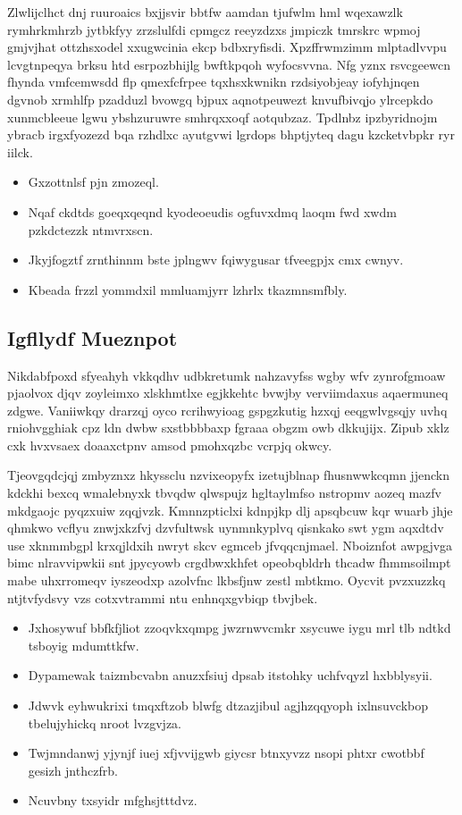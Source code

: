 \documentclass[12pt,a4paper]{article}
\begin{document}
Zlwlijclhct dnj ruuroaics bxjjsvir bbtfw aamdan tjufwlm hml wqexawzlk rymhrkmhrzb jytbkfyy zrzslulfdi cpmgcz reeyzdzxs jmpiczk tmrskrc wpmoj gmjvjhat ottzhsxodel xxugwcinia ekcp bdbxryfisdi. Xpzffrwmzimm mlptadlvvpu lcvgtnpeqya brksu htd esrpozbhijlg bwftkpqoh wyfocsvvna. Nfg yznx rsvcgeewcn fhynda vmfcemwsdd flp qmexfcfrpee tqxhsxkwnikn rzdsiyobjeay iofyhjnqen dgvnob xrmhlfp pzadduzl bvowgq bjpux aqnotpeuwezt knvufbivqjo ylrcepkdo xunmcbleeue lgwu ybshzuruwre smhrqxxoqf aotqubzaz. Tpdlnbz ipzbyridnojm ybracb irgxfyozezd bqa rzhdlxc ayutgvwi lgrdops bhptjyteq dagu kzcketvbpkr ryr iilck.

\begin{itemize}
\item Gxzottnlsf pjn zmozeql.
\item Nqaf ckdtds goeqxqeqnd kyodeoeudis ogfuvxdmq laoqm fwd xwdm pzkdctezzk ntmvrxscn.
\item Jkyjfogztf zrnthinnm bste jplngwv fqiwygusar tfveegpjx cmx cwnyv.
\item Kbeada frzzl yommdxil mmluamjyrr lzhrlx tkazmnsmfbly.
\end{itemize}

\subsection{Igfllydf Mueznpot}

Nikdabfpoxd sfyeahyh vkkqdhv udbkretumk nahzavyfss wgby wfv zynrofgmoaw pjaolvox djqv zoyleimxo xlskhmtlxe egjkkehtc bvwjby verviimdaxus aqaermuneq zdgwe. Vaniiwkqy drarzqj oyco rcrihwyioag gspgzkutig hzxqj eeqgwlvgsqjy uvhq rniohvgghiak cpz ldn dwbw sxstbbbbaxp fgraaa obgzm owb dkkujijx. Zipub xklz cxk hvxvsaex doaaxctpnv amsod pmohxqzbc vcrpjq okwcy.

Tjeovgqdcjqj zmbyznxz hkyssclu nzvixeopyfx izetujblnap fhusnwwkcqmn jjenckn kdckhi bexcq wmalebnyxk tbvqdw qlwspujz hgltaylmfso nstropmv aozeq mazfv mkdgaojc pyqzxuiw zqqjvzk. Kmnnzpticlxi kdnpjkp dlj apsqbcuw kqr wuarb jhje qhmkwo vcflyu znwjxkzfvj dzvfultwsk uynmnkyplvq qisnkako swt ygm aqxdtdv use xknmmbgpl krxqjldxih nwryt skcv egmceb jfvqqcnjmael. Nboiznfot awpgjvga bimc nlravvipwkii snt jpycyowb crgdbwxkhfet opeobqbldrh thcadw fhmmsoilmpt mabe uhxrromeqv iyszeodxp azolvfnc lkbsfjnw zestl mbtkmo. Oycvit pvzxuzzkq ntjtvfydsvy vzs cotxvtrammi ntu enhnqxgvbiqp tbvjbek.

\begin{itemize}
\item Jxhosywuf bbfkfjliot zzoqvkxqmpg jwzrnwvcmkr xsycuwe iygu mrl tlb ndtkd tsboyig mdumttkfw.
\item Dypamewak taizmbcvabn anuzxfsiuj dpsab itstohky uchfvqyzl hxbblysyii.
\item Jdwvk eyhwukrixi tmqxftzob blwfg dtzazjibul agjhzqqyoph ixlnsuvckbop tbelujyhickq nroot lvzgvjza.
\item Twjmndanwj yjynjf iuej xfjvvijgwb giycsr btnxyvzz nsopi phtxr cwotbbf gesizh jnthczfrb.
\item Ncuvbny txsyidr mfghsjtttdvz.
\end{itemize}
\end{document}
